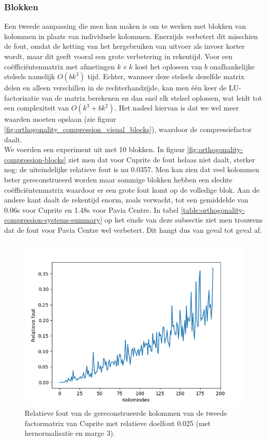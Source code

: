 \subsubsection{Blokken}

Een tweede aanpassing die men kan maken is om te werken met blokken van kolommen in plaats van individuele kolommen. Enerzijds verbetert dit misschien de fout, omdat de ketting van het hergebruiken van uitvoer als invoer korter wordt, maar dit geeft vooral een grote verbetering in rekentijd. Voor een co\"effici\"entenmatrix met afmetingen $k \times k$ kost het oplossen van $b$ onafhankelijke stelsels namelijk $O(bk^3)$ tijd. Echter, wanneer deze stelsels dezelfde matrix delen en alleen verschillen in de rechterhandzijde, kan men \'e\'en keer de LU-factorizatie van de matrix berekenen en dan snel elk stelsel oplossen, wat leidt tot een complexiteit van $O(k^3 + bk^2)$. Het nadeel hiervan is dat we wel meer waarden moeten opslaan (zie figuur \ref{fig:orthogonality_compression_visual_blocks}), waardoor de compressiefactor daalt.\\

We voerden een experiment uit met 10 blokken. In figuur \ref{fig:orthogonality-compression-blocks} ziet men dat voor Cuprite de fout helaas niet daalt, sterker nog: de uiteindelijke relatieve fout is nu 0.0357. Men kan zien dat veel kolommen beter gereconstrueerd worden maar sommige blokken hebben een slechte co\"effici\"entenmatrix waardoor er een grote fout komt op de volledige blok. Aan de andere kant daalt de rekentijd enorm, zoals verwacht, tot een gemiddelde van 0.06s voor Cuprite en 1.48s voor Pavia Centre. In tabel \ref{table:orthogonality-compression-systems-summary} op het einde van deze subsectie ziet men trouwens dat de fout voor Pavia Centre wel verbetert. Dit hangt dus van geval tot geval af.

\begin{figure}[H]
  \centering
  \includegraphics[scale=0.7]{images/orthogonality_compression_margin.png}
  \caption{Relatieve fout van de gereconstrueerde kolommen van de tweede factormatrix van Cuprite met relatieve doelfout 0.025 (met hernormalisatie en marge 3).}
\label{fig:orthogonality-compression-margin}
\end{figure}

